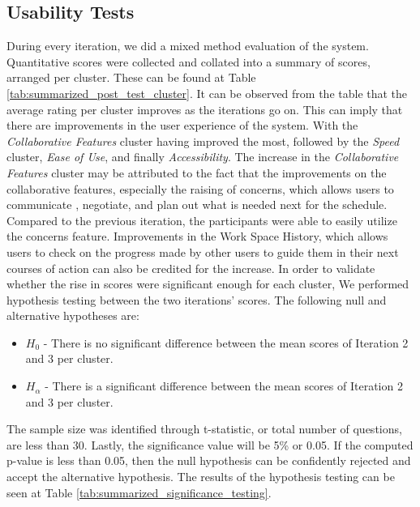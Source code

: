 \subsection{Usability Tests}

During every iteration, we did a mixed method evaluation of the system. Quantitative scores were collected and collated into a summary of scores, arranged per cluster. These can be found at Table \ref{tab:summarized_post_test_cluster}. It can be observed from the table that the average rating per cluster improves as the iterations go on. This can imply that there are improvements in the user experience of the system. With the \textit{Collaborative Features} cluster having improved the most, followed by the \textit{Speed} cluster, \textit{Ease of Use}, and finally \textit{Accessibility}. The increase in the \textit{Collaborative Features} cluster may be attributed to the fact that the improvements on the collaborative features, especially the raising of concerns, which allows users to communicate , negotiate, and plan out what is needed next for the schedule. Compared to the previous iteration, the participants were able to easily utilize the concerns feature. Improvements in the Work Space History, which allows users to check on the progress made by other users to guide them in their next courses of action can also be credited for the increase.  In order to validate whether the rise in scores were significant enough for each cluster, We performed hypothesis testing between the two iterations' scores. The following null and alternative hypotheses are: 
 \label{list:significance_testing}
 \begin{itemize}
    \item $H_0$ - There is no significant difference between the mean scores of Iteration 2 and 3 per cluster.
    \item $H_\alpha$ - There is a significant difference between the mean scores of Iteration 2 and 3 per cluster.
\end{itemize}
The sample size was identified through t-statistic, or total number of questions, are less than 30. Lastly, the significance value will be 5\% or 0.05. If the computed p-value is less than 0.05, then the null hypothesis can be confidently rejected and accept the alternative hypothesis. The results of the hypothesis testing can be seen at Table \ref{tab:summarized_significance_testing}.

